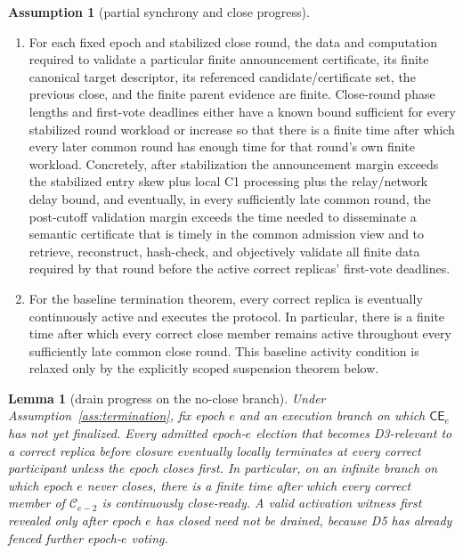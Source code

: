 \documentclass[11pt]{article}
\newtheorem{lemma}[theorem]{Lemma}
\theoremstyle{definition}
\newtheorem{assumption}[theorem]{Assumption}
\theoremstyle{remark}
\newcommand{\C}{\mathcal C}
\newcommand{\CE}{\mathsf{CE}}
\begin{document}
\begin{assumption}[partial synchrony and close progress]
\begin{enumerate}[label=(\roman*)]
  \item For each fixed epoch and stabilized close round, the data and computation required to validate a particular finite announcement certificate, its finite canonical target descriptor, its referenced candidate/certificate set, the previous close, and the finite parent evidence are finite. Close-round phase lengths and first-vote deadlines either have a known bound sufficient for every stabilized round workload or increase so that there is a finite time after which every later common round has enough time for that round's own finite workload. Concretely, after stabilization the announcement margin exceeds the stabilized entry skew plus local C1 processing plus the relay/network delay bound, and eventually, in every sufficiently late common round, the post-cutoff validation margin exceeds the time needed to disseminate a semantic certificate that is timely in the common admission view and to retrieve, reconstruct, hash-check, and objectively validate all finite data required by that round before the active correct replicas' first-vote deadlines.
  \item For the baseline termination theorem, every correct replica is eventually continuously active and executes the protocol. In particular, there is a finite time after which every correct close member remains active throughout every sufficiently late common close round. This baseline activity condition is relaxed only by the explicitly scoped suspension theorem below.
\end{enumerate}
\end{assumption}

\begin{lemma}[drain progress on the no-close branch]
\label{lem:drain}
Under Assumption~\ref{ass:termination}, fix epoch $e$ and an execution branch on which $\CE_e$ has not yet finalized. Every admitted epoch-$e$ election that becomes D3-relevant to a correct replica before closure eventually locally terminates at every correct participant unless the epoch closes first. In particular, on an infinite branch on which epoch $e$ never closes, there is a finite time after which every correct member of $\C_{e-2}$ is continuously close-ready. A valid activation witness first revealed only after epoch $e$ has closed need not be drained, because D5 has already fenced further epoch-$e$ voting.
\end{lemma}
\end{document}
